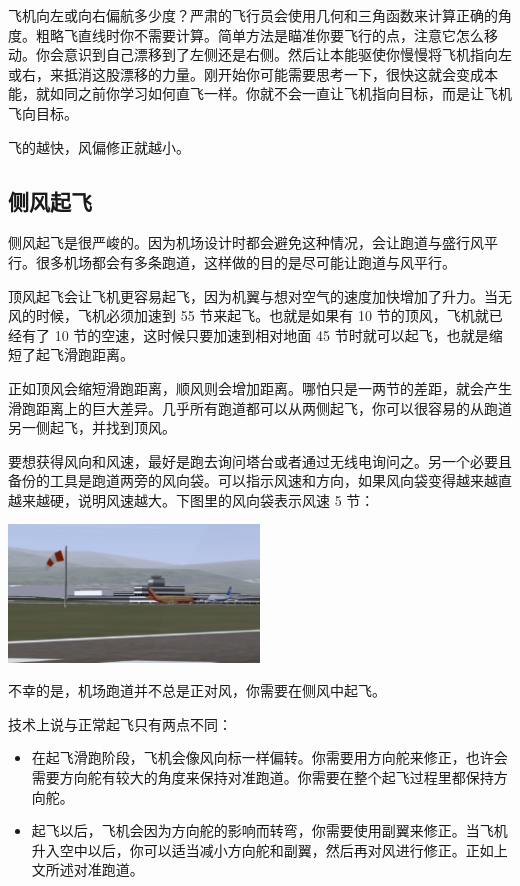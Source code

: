 飞机向左或向右偏航多少度？严肃的飞行员会使用几何和三角函数来计算正确的角度。粗略飞直线时你不需要计算。简单方法是瞄准你要飞行的点，注意它怎么移动。你会意识到自己漂移到了左侧还是右侧。然后让本能驱使你慢慢将飞机指向左或右，来抵消这股漂移的力量。刚开始你可能需要思考一下，很快这就会变成本能，就如同之前你学习如何直飞一样。你就不会一直让飞机指向目标，而是让飞机飞向目标。

飞的越快，风偏修正就越小。

\subsection{侧风起飞}
\label{sec:Swsw}

侧风起飞是很严峻的。因为机场设计时都会避免这种情况，会让跑道与盛行风平行。很多机场都会有多条跑道，这样做的目的是尽可能让跑道与风平行。

顶风起飞会让飞机更容易起飞，因为机翼与想对空气的速度加快增加了升力。当无风的时候，飞机必须加速到 55 节来起飞。也就是如果有 10 节的顶风，飞机就已经有了 10 节的空速，这时候只要加速到相对地面 45 节时就可以起飞，也就是缩短了起飞滑跑距离。

正如顶风会缩短滑跑距离，顺风则会增加距离。哪怕只是一两节的差距，就会产生滑跑距离上的巨大差异。几乎所有跑道都可以从两侧起飞，你可以很容易的从跑道另一侧起飞，并找到顶风。

要想获得风向和风速，最好是跑去询问塔台或者通过无线电询问之。另一个必要且备份的工具是跑道两旁的风向袋。可以指示风速和方向，如果风向袋变得越来越直越来越硬，说明风速越大。下图里的风向袋表示风速 5 节：

\begin{center}
\includegraphics[width=0.5\textwidth]{img/tut_46}
\end{center}

不幸的是，机场跑道并不总是正对风，你需要在侧风中起飞。

技术上说与正常起飞只有两点不同：
\begin{itemize}
    \item 在起飞滑跑阶段，飞机会像风向标一样偏转。你需要用方向舵来修正，也许会需要方向舵有较大的角度来保持对准跑道。你需要在整个起飞过程里都保持方向舵。
    \item 起飞以后，飞机会因为方向舵的影响而转弯，你需要使用副翼来修正。当飞机升入空中以后，你可以适当减小方向舵和副翼，然后再对风进行修正。正如上文所述对准跑道。
\end{itemize}

